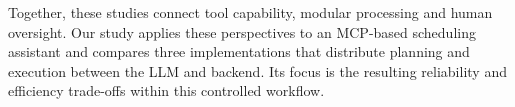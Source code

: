 Together, these studies connect tool capability, modular processing and human oversight.
Our study applies these perspectives to an MCP-based scheduling assistant and compares three implementations that distribute planning and execution between the LLM and backend.
Its focus is the resulting reliability and efficiency trade-offs within this controlled workflow.
